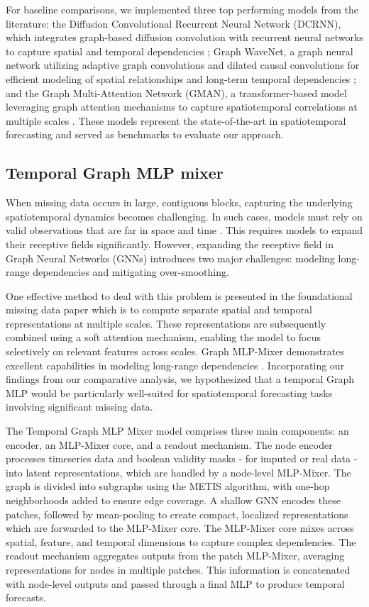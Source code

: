 \documentclass{article}
\theoremstyle{plain}
\theoremstyle{definition}
\theoremstyle{remark}
\begin{document}
For baseline comparisons, we implemented three top performing models from the literature: the Diffusion Convolutional Recurrent Neural Network (DCRNN), which integrates graph-based diffusion convolution with recurrent neural networks to capture spatial and temporal dependencies \cite{li2017diffusion}; Graph WaveNet, a graph neural network utilizing adaptive graph convolutions and dilated causal convolutions for efficient modeling of spatial relationships and long-term temporal dependencies \cite{waveNet2019graph}; and the Graph Multi-Attention Network (GMAN), a transformer-based model leveraging graph attention mechanisms to capture spatiotemporal correlations at multiple scales \cite{zheng2020gman}. These models represent the state-of-the-art in spatiotemporal forecasting and served as benchmarks to evaluate our approach.

\subsection{Temporal Graph MLP mixer}
When missing data occurs in large, contiguous blocks, capturing the underlying spatiotemporal dynamics becomes challenging. In such cases, models must rely on valid observations that are far in space and time \cite{marisca2024graph}. This requires models to expand their receptive fields significantly. However, expanding the receptive field in Graph Neural Networks (GNNs) introduces two major challenges: modeling long-range dependencies and mitigating over-smoothing.

One effective method to deal with this problem is presented in the foundational missing data paper \cite{marisca2024graph} which is to compute separate spatial and temporal representations at multiple scales. These representations are subsequently combined using a soft attention mechanism, enabling the model to focus selectively on relevant features across scales. Graph MLP-Mixer demonstrates excellent capabilities in modeling long-range dependencies \cite{he2023generalization}. Incorporating our findings from our comparative analysis, we hypothesized that a temporal Graph MLP would be particularly well-suited for spatiotemporal forecasting tasks involving significant missing data. 

The Temporal Graph MLP Mixer model comprises three main components: an encoder, an MLP-Mixer core, and a readout mechanism. The node encoder processes timeseries data and boolean validity masks - for imputed or real data - into latent representations, which are handled by a node-level MLP-Mixer. The graph is divided into subgraphs using the METIS algorithm, with one-hop neighborhoods added to ensure edge coverage. A shallow GNN encodes these patches, followed by mean-pooling to create compact, localized representations which are forwarded to the MLP-Mixer core. The MLP-Mixer core mixes across spatial, feature, and temporal dimensions to capture complex dependencies. The readout mechanism aggregates outputs from the patch MLP-Mixer, averaging representations for nodes in multiple patches. This information is concatenated with node-level outputs and passed through a final MLP to produce temporal forecasts. 
\end{document}
